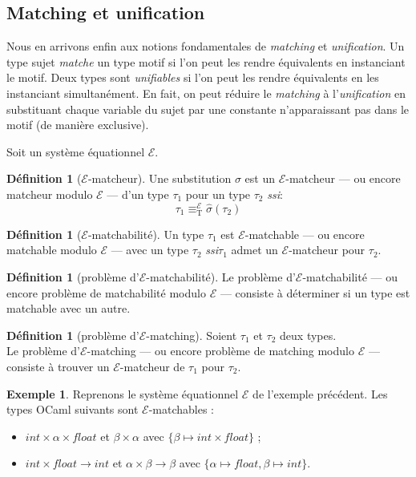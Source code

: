 \documentclass[a4paper]{report}
\theoremstyle{definition}
\newtheorem{definition}[theoreme]{Définition}
\newtheorem{exemple}[theoreme]{Exemple}
\newcommand{\ssi}{\textit{ssi}\xspace}
\newcommand{\E}{\mathscr{E}}
\newcommand{\T}{\mathrm{T}}
\begin{document}

\subsection{Matching et unification}

Nous en arrivons enfin aux notions fondamentales de \emph{matching} et \emph{unification}. Un type sujet \emph{matche} un type motif si l'on peut les rendre équivalents en instanciant le motif. Deux types sont \emph{unifiables} si l'on peut les rendre équivalents en les instanciant simultanément. En fait, on peut réduire le \emph{matching} à l'\emph{unification} en substituant chaque variable du sujet par une constante n'apparaissant pas dans le motif (de manière exclusive).

Soit un système équationnel $\E$.

\begin{definition}[$\E$-matcheur]
  Une substitution $\sigma$ est un $\E$-matcheur — ou encore matcheur modulo $\E$ — d'un type $\tau_1$ pour un type $\tau_2$ \ssi :
  \[ \tau_1 \equiv_\T^\E \hat\sigma (\tau_2) \]
\end{definition}

\begin{definition}[$\E$-matchabilité]
  Un type $\tau_1$ est $\E$-matchable — ou encore matchable modulo $\E$ — avec un type $\tau_2$ \ssi $\tau_1$ admet un $\E$-matcheur pour $\tau_2$.
\end{definition}

\begin{definition}[problème d'$\E$-matchabilité]
  Le problème d'$\E$-matchabilité — ou encore problème de matchabilité modulo $\E$ — consiste à déterminer si un type est matchable avec un autre.
\end{definition}

\begin{definition}[problème d'$\E$-matching]
  Soient $\tau_1$ et $\tau_2$ deux types. \\
  Le problème d'$\E$-matching — ou encore problème de matching modulo $\E$ — consiste à trouver un $\E$-matcheur de $\tau_1$ pour $\tau_2$.
\end{definition}

\begin{exemple}
  Reprenons le système équationnel $\E$ de l'exemple précédent. Les types OCaml suivants sont $\E$-matchables :
  \begin{itemize}
    \item $int \times \alpha \times float$ et $\beta \times \alpha$ avec $\{ \beta \mapsto int \times float \}$ ;
    \item $int \times float \rightarrow int$ et $\alpha \times \beta \rightarrow \beta$ avec $\{ \alpha \mapsto float, \beta \mapsto int \}$.
  \end{itemize}
\end{exemple}
\end{document}
